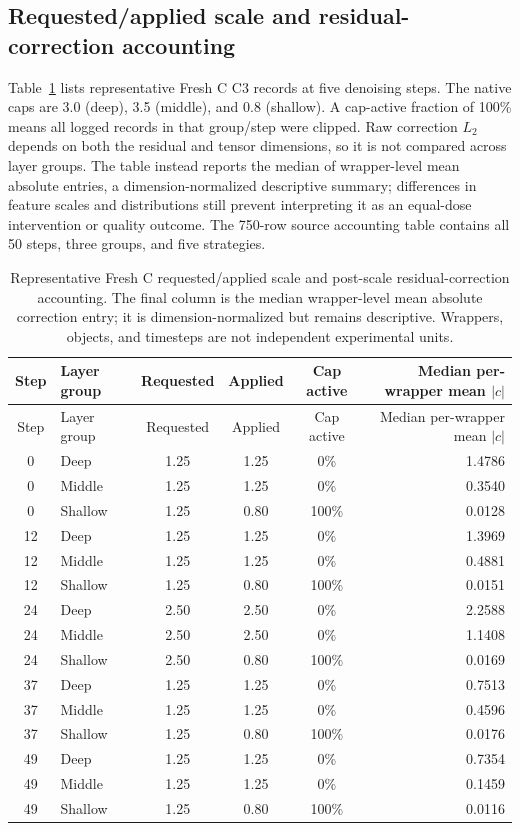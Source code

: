 \documentclass[11pt]{article}
\begin{document}
\subsection*{Requested/applied scale and residual-correction accounting}
Table~\ref{tab:supp-execution} lists representative Fresh C C3 records at five denoising steps. The native caps are 3.0 (deep), 3.5 (middle), and 0.8 (shallow). A cap-active fraction of 100\% means all logged records in that group/step were clipped. Raw correction $L_2$ depends on both the residual and tensor dimensions, so it is not compared across layer groups. The table instead reports the median of wrapper-level mean absolute entries, a dimension-normalized descriptive summary; differences in feature scales and distributions still prevent interpreting it as an equal-dose intervention or quality outcome. The 750-row source accounting table contains all 50 steps, three groups, and five strategies.

\begingroup\scriptsize
\begin{longtable}{c l c c c r}
\caption{Representative Fresh C requested/applied scale and post-scale residual-correction accounting. The final column is the median wrapper-level mean absolute correction entry; it is dimension-normalized but remains descriptive. Wrappers, objects, and timesteps are not independent experimental units.}\label{tab:supp-execution}\\
\toprule Step & Layer group & Requested & Applied & Cap active & Median per-wrapper mean $|c|$ \\
\midrule\endfirsthead
\toprule Step & Layer group & Requested & Applied & Cap active & Median per-wrapper mean $|c|$ \\
\midrule\endhead
0 & Deep & 1.25 & 1.25 & 0\% & 1.4786 \\
0 & Middle & 1.25 & 1.25 & 0\% & 0.3540 \\
0 & Shallow & 1.25 & 0.80 & 100\% & 0.0128 \\
12 & Deep & 1.25 & 1.25 & 0\% & 1.3969 \\
12 & Middle & 1.25 & 1.25 & 0\% & 0.4881 \\
12 & Shallow & 1.25 & 0.80 & 100\% & 0.0151 \\
24 & Deep & 2.50 & 2.50 & 0\% & 2.2588 \\
24 & Middle & 2.50 & 2.50 & 0\% & 1.1408 \\
24 & Shallow & 2.50 & 0.80 & 100\% & 0.0169 \\
37 & Deep & 1.25 & 1.25 & 0\% & 0.7513 \\
37 & Middle & 1.25 & 1.25 & 0\% & 0.4596 \\
37 & Shallow & 1.25 & 0.80 & 100\% & 0.0176 \\
49 & Deep & 1.25 & 1.25 & 0\% & 0.7354 \\
49 & Middle & 1.25 & 1.25 & 0\% & 0.1459 \\
49 & Shallow & 1.25 & 0.80 & 100\% & 0.0116 \\
\bottomrule
\end{longtable}
\end{document}
